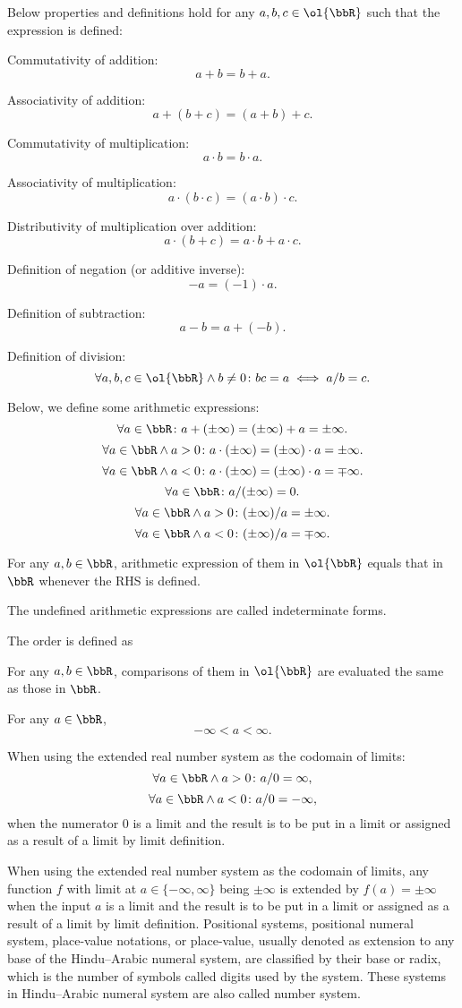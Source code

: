 \documentclass[a4paper,12pt]{report}
\begin{document}
\begin{itemizle}
\bit
\item Below properties and definitions hold for any $a,b,c\in\ol{\bbR}$ such that the expression is defined:
\bit
\item Commutativity of addition:
\[a+b=b+a.\]
\item Associativity of addition:
\[a+(b+c)=(a+b)+c.\]
\item Commutativity of multiplication:
\[a\cdot b=b\cdot a.\]
\item Associativity of multiplication:
\[a\cdot (b\cdot c)=(a\cdot b)\cdot c.\]
\item Distributivity of multiplication over addition:
\[a\cdot (b+c)=a\cdot b+a\cdot c.\]
\item Definition of negation (or additive inverse):
\[-a=(-1)\cdot a.\]
\item Definition of subtraction:
\[a-b=a+(-b).\]
\item Definition of division:
\[\forall a,b,c\in\ol{\bbR}\land b\neq 0\colon bc=a\iff a/b=c.\]
\eit
\item Below, we define some arithmetic expressions:
\[\forall a\in\bbR\colon a+(\pm\infty)=(\pm\infty)+a=\pm\infty.\]
\[\forall a\in\bbR\land a>0\colon a\cdot(\pm\infty)=(\pm\infty)\cdot a=\pm\infty.\]
\[\forall a\in\bbR\land a<0\colon a\cdot(\pm\infty)=(\pm\infty)\cdot a=\mp\infty.\]
\[\forall a\in\bbR\colon a/(\pm\infty)=0.\]
\[\forall a\in\bbR\land a>0\colon(\pm\infty)/a=\pm\infty.\]
\[\forall a\in\bbR\land a<0\colon(\pm\infty)/a=\mp\infty.\]
\item For any $a,b\in\bbR$, arithmetic expression of them in $\ol{\bbR}$ equals that in $\bbR$ whenever the RHS is defined.
\item The undefined arithmetic expressions are called indeterminate forms.
\item The order is defined as
\bit
\item For any $a,b\in\bbR$, comparisons of them in $\ol{\bbR}$ are evaluated the same as those in $\bbR$.
\item For any $a\in\bbR$,
\[-\infty<a<\infty.\]
\eit
\item When using the extended real number system as the codomain of limits:
\[\forall a\in\bbR\land a>0\colon a/0=\infty,\]
\[\forall a\in\bbR\land a<0\colon a/0=-\infty,\]
when the numerator $0$ is a limit and the result is to be put in a limit or assigned as a result of a limit by limit definition.
\item When using the extended real number system as the codomain of limits, any function $f$ with limit at $a\in\{-\infty,\infty\}$ being $\pm\infty$ is extended by $f(a)=\pm\infty$ when the input $a$ is a limit and the result is to be put in a limit or assigned as a result of a limit by limit definition.
\eit
{}
Positional systems, positional numeral system, place-value notations, or place-value, usually denoted as extension to any base of the Hindu–Arabic numeral system, are classified by their base or radix, which is the number of symbols called digits used by the system. These systems in Hindu–Arabic numeral system are also called number system.


\end{itemizle}
\end{document}
